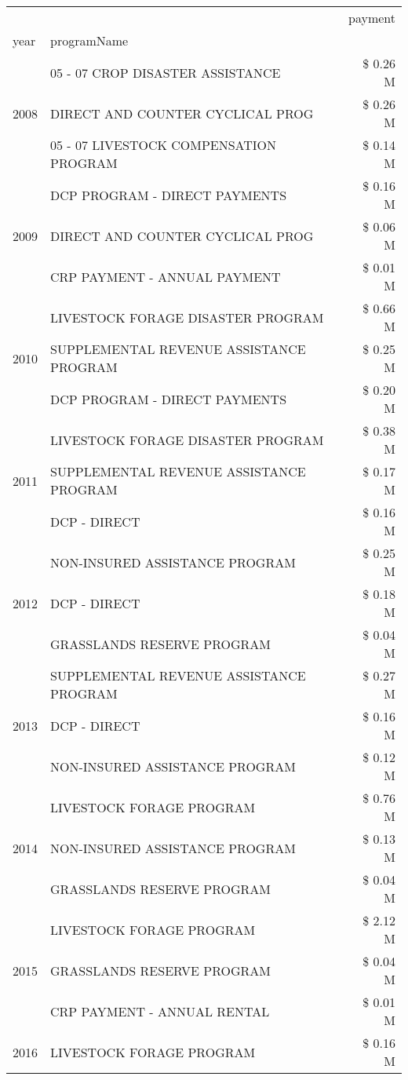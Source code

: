 \begin{tabular}{llr}
\toprule
 &  & payment \\
year & programName &  \\
\midrule
\multirow[t]{3}{*}{2008} & 05 - 07 CROP DISASTER ASSISTANCE & \$ 0.26 M \\
 & DIRECT AND COUNTER CYCLICAL PROG & \$ 0.26 M \\
 & 05 - 07 LIVESTOCK COMPENSATION PROGRAM & \$ 0.14 M \\
\cline{1-3}
\multirow[t]{3}{*}{2009} & DCP PROGRAM - DIRECT PAYMENTS & \$ 0.16 M \\
 & DIRECT AND COUNTER CYCLICAL PROG & \$ 0.06 M \\
 & CRP PAYMENT - ANNUAL PAYMENT & \$ 0.01 M \\
\cline{1-3}
\multirow[t]{3}{*}{2010} & LIVESTOCK FORAGE DISASTER  PROGRAM & \$ 0.66 M \\
 & SUPPLEMENTAL REVENUE ASSISTANCE PROGRAM & \$ 0.25 M \\
 & DCP PROGRAM - DIRECT PAYMENTS & \$ 0.20 M \\
\cline{1-3}
\multirow[t]{3}{*}{2011} & LIVESTOCK FORAGE DISASTER PROGRAM & \$ 0.38 M \\
 & SUPPLEMENTAL REVENUE ASSISTANCE PROGRAM & \$ 0.17 M \\
 & DCP - DIRECT & \$ 0.16 M \\
\cline{1-3}
\multirow[t]{3}{*}{2012} & NON-INSURED ASSISTANCE PROGRAM & \$ 0.25 M \\
 & DCP - DIRECT & \$ 0.18 M \\
 & GRASSLANDS RESERVE PROGRAM & \$ 0.04 M \\
\cline{1-3}
\multirow[t]{3}{*}{2013} & SUPPLEMENTAL REVENUE ASSISTANCE PROGRAM & \$ 0.27 M \\
 & DCP - DIRECT & \$ 0.16 M \\
 & NON-INSURED ASSISTANCE PROGRAM & \$ 0.12 M \\
\cline{1-3}
\multirow[t]{3}{*}{2014} & LIVESTOCK FORAGE PROGRAM & \$ 0.76 M \\
 & NON-INSURED ASSISTANCE PROGRAM & \$ 0.13 M \\
 & GRASSLANDS RESERVE PROGRAM & \$ 0.04 M \\
\cline{1-3}
\multirow[t]{3}{*}{2015} & LIVESTOCK FORAGE PROGRAM & \$ 2.12 M \\
 & GRASSLANDS RESERVE PROGRAM & \$ 0.04 M \\
 & CRP PAYMENT - ANNUAL RENTAL & \$ 0.01 M \\
\cline{1-3}
\multirow[t]{3}{*}{2016} & LIVESTOCK FORAGE PROGRAM & \$ 0.16 M \\

\end{tabular}
